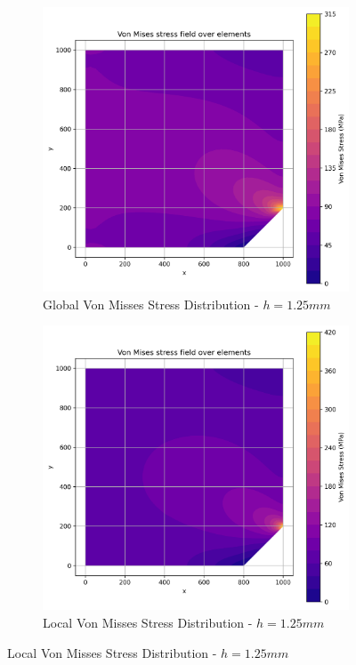 \begin{figure}[H]
  \centering
  \begin{subfigure}[b]{0.45\textwidth}
    \centering
    \includegraphics[width=\textwidth]{GRAFICOS/Quad4/1.25mm_global/resultados_von_mises.png}
    \caption{Global Von Misses Stress Distribution - $h=1.25mm$}
    \label{fig:img13}
  \end{subfigure}
  \hfill
  \begin{subfigure}[b]{0.45\textwidth}
    \centering
    \includegraphics[width=\textwidth]{GRAFICOS/Quad4/1.25mm_local/resultados_von_mises.png}
    \caption{Local Von Misses Stress Distribution - $h=1.25mm$}
    \label{fig:img23}
  \end{subfigure}
\end{figure}

